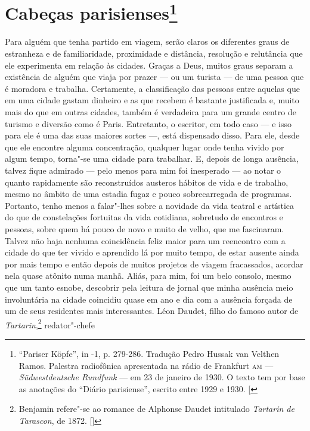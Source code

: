 \chapter{Cabeças parisienses\footnote[*]{``Pariser Köpfe'', in -1, p.
  279-286. Tradução Pedro Hussak van Velthen Ramos. Palestra radiofônica apresentada na rádio de Frankfurt \textsc{am} --- \emph{Südwestdeutsche Rundfunk} --- em 23 de janeiro de 1930. O texto tem por base as anotações do ``Diário parisiense'', escrito entre 1929 e 1930. {[}\versal{N.~E.}{]}}}

Para alguém que tenha partido em viagem, serão claros os diferentes
graus de estranheza e de familiaridade, proximidade e distância,
resolução e relutância que ele experimenta em relação às cidades. Graças
a Deus, muitos graus separam a existência de alguém que viaja por prazer
--- ou um turista --- de uma pessoa que é moradora e trabalha. Certamente, a
classificação das pessoas entre aquelas que em uma cidade gastam
dinheiro e as que recebem é bastante justificada e, muito mais do que em outras cidades, também é verdadeira para um grande centro de turismo e
diversão como é Paris. Entretanto, o escritor, em todo caso --- e isso para ele é uma das suas maiores sortes ---, está dispensado disso. Para ele, desde que ele encontre alguma concentração, qualquer lugar
onde tenha vivido por algum tempo, torna"-se uma cidade para
trabalhar. E, depois de longa ausência, talvez fique admirado --- pelo menos para mim foi inesperado --- ao notar o quanto rapidamente são reconstruídos austeros hábitos de vida e de trabalho, mesmo no âmbito de uma estadia fugaz e pouco sobrecarregada de programas. Portanto, tenho menos a falar"-lhes sobre a novidade da vida teatral e artística do que de constelações fortuitas da vida cotidiana, sobretudo de encontros e pessoas, sobre quem há pouco de novo e muito de velho, que me fascinaram.
Talvez não haja nenhuma coincidência feliz maior para um reencontro com
a cidade do que ter vivido e aprendido lá por muito tempo, de estar
ausente ainda por mais tempo e então depois de muitos projetos de viagem
fracassados, acordar nela quase atônito numa manhã. Aliás, para mim, foi
um belo consolo, mesmo que um tanto esnobe, descobrir pela leitura de
jornal que minha ausência meio involuntária na cidade coincidiu quase em
ano e dia com a ausência forçada de um de seus residentes mais
interessantes. Léon Daudet, filho do famoso autor de
\emph{Tartarin},\footnote{Benjamin refere"-se ao romance de Alphonse
  Daudet intitulado \emph{Tartarin de Tarascon}, de 1872. []} redator"-chefe
